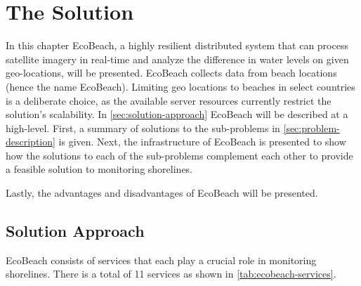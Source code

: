 \chapter{The Solution}

In this chapter EcoBeach, a highly resilient distributed system that can process satellite imagery in real-time and analyze the difference in water levels on given geo-locations, will be presented.
EcoBeach collects data from beach locations (hence the name EcoBeach). Limiting geo locations to beaches in select countries is a deliberate choice, as the available server resources currently restrict the solution's scalability. \medbreak
\noindent
In \autoref{sec:solution-approach}  EcoBeach will be described at a high-level. First, a summary of solutions to the sub-problems in \autoref{sec:problem-description} is given. Next, the infrastructure of EcoBeach is presented to show how the solutions to each of the sub-problems complement each other to provide a feasible solution to monitoring shorelines.

Lastly, the advantages and disadvantages of EcoBeach will be presented.

\section{Solution Approach}\label{sec:solution-approach}

EcoBeach consists of services that each play a crucial role in monitoring shorelines. There is a total of 11 services as shown in \autoref{tab:ecobeach-services}.

